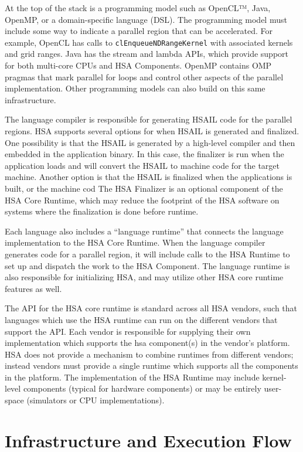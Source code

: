 \documentclass{book}
\begin{document}
At the top of the stack is a programming model such as OpenCL™,
Java, OpenMP, or a domain-specific language (DSL).   The programming
model must include some way to indicate a parallel region that can
be accelerated.  For example, OpenCL has calls to
\texttt{clEnqueueNDRangeKernel} with associated kernels and grid ranges.
Java has the stream and lambda APIs, which provide support for both
multi-core CPUs and HSA Components.  OpenMP contains OMP pragmas
that mark parallel for loops and control other aspects of the
parallel implementation.  Other programming models can also build on
this same infrastructure.

The language compiler is responsible for generating HSAIL code for
the parallel regions.  HSA supports several options for when HSAIL
is generated and finalized.  One possibility is that the HSAIL is
generated by a high-level compiler and then embedded in the
application binary.  In this case, the finalizer is run when the
application loads and will convert the HSAIL to machine code for the
target machine.   Another option is that the HSAIL is finalized when
the applications is built, or the machine cod  The HSA Finalizer is
an optional component of the HSA Core Runtime, which may reduce the
footprint of the HSA software on systems where the finalization is
done before runtime.

Each language also includes a “language runtime” that connects the
language implementation to the HSA Core Runtime.   When the language
compiler generates code for a parallel region, it will include calls
to the HSA Runtime to set up and dispatch the work to the HSA
Component.   The language runtime is also responsible for
initializing HSA, and may utilize other HSA core runtime features as
well.

The API for the HSA core runtime is standard across all HSA vendors,
such that languages which use the HSA runtime can run on the
different vendors that support the API.  Each vendor is responsible
for supplying their own implementation which supports the hsa
component(s) in the vendor’s platform.   HSA does not provide a
mechanism to combine runtimes from different vendors; instead
vendors must provide a single runtime which supports all the
components in the platform.
The implementation of the HSA Runtime may include kernel-level
components (typical for hardware components) or may be entirely
user-space (simulators or CPU implementations).

\hypertarget{glue}{}\section{ Infrastructure and Execution
Flow}\label{glue}
\end{document}
